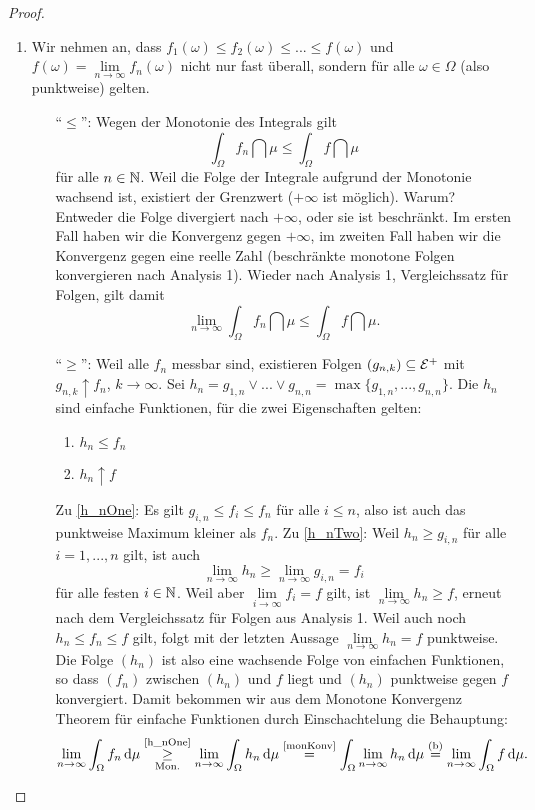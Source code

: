 \begin{proof}\abs
	\begin{enumerate}[label=(\roman*)]
		\item\label{allgMCTfastu} Wir nehmen an, dass $f_1(\omega) \leq f_2(\omega) \leq ... \leq f(\omega)$ und $f(\omega) = \lim\limits_{n \to \infty} f_n(\omega)$ nicht nur fast überall, sondern für alle $\omega \in \Omega$ (also punktweise) gelten.
		\begin{itemize}
			\item[\enquote{$\leq$}:] Wegen der Monotonie des Integrals gilt \[ \int_{\Omega} f_n \dint\mu \leq \int_{\Omega} f \dint\mu \] f\"ur alle $n\in\mathbb{N}$. Weil die Folge der Integrale aufgrund der Monotonie wachsend ist, existiert der Grenzwert ($+\infty$ ist m\"oglich). Warum? Entweder die Folge divergiert nach $+\infty$, oder sie ist beschr\"ankt. Im ersten Fall haben wir die Konvergenz gegen $+\infty$, im zweiten Fall haben wir die Konvergenz gegen eine reelle Zahl (beschr\"ankte monotone Folgen konvergieren nach Analysis 1). Wieder nach Analysis 1, Vergleichssatz f\"ur Folgen, gilt damit \[ \lim\limits_{n \to \infty} \int_{\Omega} f_n \dint\mu \leq \int_{\Omega} f \dint\mu. \]
			\item[\enquote{$\geq$}:] Weil alle $f_n$ messbar sind, existieren Folgen $(g_{n,k}) \subseteq \mathcal{E}^+$ mit $g_{n,k} \uparrow f_n$, $ k\to \infty $. Sei $h_n = g_{1,n} \lor ... \lor g_{n,n} = \max \{ g_{1,n},...,g_{n,n} \} $. Die $h_n$ sind einfache Funktionen, für die zwei Eigenschaften gelten:
			\begin{enumerate}[label=(\alph*)]
				\item\label{h_nOne} $h_n \leq f_n$
				\item\label{h_nTwo} $h_n \uparrow f$
			\end{enumerate}
			Zu \ref{h_nOne}: Es gilt $g_{i,n} \leq f_i\leq f_n$ für alle $i \leq n$, also ist auch das punktweise Maximum kleiner als $f_n$. Zu \ref{h_nTwo}: Weil $h_n \geq g_{i,n}$ f\"ur alle $i = 1,...,n$ gilt, ist auch $$\lim\limits_{n \to \infty} h_n \geq \lim\limits_{n \to \infty} g_{i,n} = f_i$$ f\"ur alle festen $i \in \mathbb{N}$. Weil aber $\lim\limits_{i \to \infty} f_i = f$ gilt, ist $\lim\limits_{n \to \infty} h_n \geq f$, erneut nach dem Vergleichssatz f\"ur Folgen aus Analysis 1. Weil auch noch $h_n \leq f_n \leq f$ gilt, folgt mit der letzten Aussage $\lim\limits_{n \to \infty} h_n = f$ punktweise. Die Folge $(h_n)$ ist also eine wachsende Folge von einfachen Funktionen, so dass $(f_n)$ zwischen $(h_n)$ und $f$ liegt und $(h_n)$ punktweise gegen $f$ konvergiert. Damit bekommen wir aus dem Monotone Konvergenz Theorem f\"ur einfache Funktionen durch Einschachtelung die Behauptung: \[ \lim\limits_{n \to \infty} \int_{\Omega}  f_n \, \mathrm{d} \mu \underset{\text{Mon.}}{\overset{\text{\ref{h_nOne}}}{\geq}} \lim\limits_{n \to \infty} \int_{\Omega}  h_n \, \mathrm{d} \mu \overset{\text{\ref{monKonv}}}{=} \int_{\Omega} \lim\limits_{n \to \infty} h_n \, \mathrm{d} \mu \overset{\text{(b)}}{=} \lim\limits_{n \to \infty} \int_{\Omega}  f \, \mathrm{d} \mu. \]

\end{itemize}
\end{enumerate}
\end{proof}
